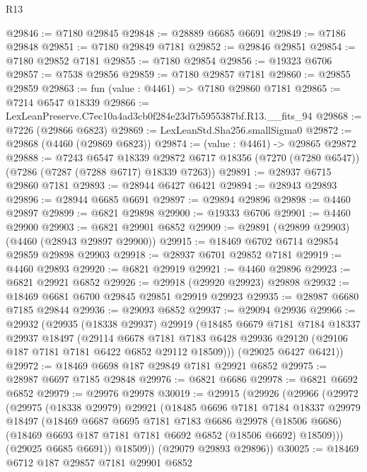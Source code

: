 \begin{lexlean}{R13}
\begin{coremodule}
@29846 := @7180 @29845
@29848 := @28889 @6685 @6691
@29849 := @7186 @29848
@29851 := @7180 @29849 @7181
@29852 := @29846 @29851
@29854 := @7180 @29852 @7181
@29855 := @7180 @29854
@29856 := @19323 @6706
@29857 := @7538 @29856
@29859 := @7180 @29857 @7181
@29860 := @29855 @29859
@29863 := fun (value : @4461) => @7180 @29860 @7181
@29865 := @7214 @6547 @18339
@29866 := LexLeanPreserve.C7ec10a4ad3cb0f284e23d7b5955387bf.R13.__fits_94
@29868 := @7226 (@29866 @6823)
@29869 := LexLeanStd.Sha256.smallSigma0
@29872 := @29868 (@4460 (@29869 @6823))
@29874 := (value : @4461) -> @29865 @29872
@29888 := @7243
    @6547
    @18339
    @29872
    @6717
    @18356
    (@7270 (@7280 @6547))
    (@7286 (@7287 (@7288 @6717) @18339 @7263))
@29891 := @28937 @6715 @29860 @7181
@29893 := @28944 @6427 @6421
@29894 := @28943 @29893
@29896 := @28944 @6685 @6691
@29897 := @29894 @29896
@29898 := @4460 @29897
@29899 := @6821 @29898
@29900 := @19333 @6706
@29901 := @4460 @29900
@29903 := @6821 @29901 @6852
@29909 := @29891 (@29899 @29903) (@4460 (@28943 @29897 @29900))
@29915 := @18469 @6702 @6714 @29854 @29859 @29898 @29903
@29918 := @28937 @6701 @29852 @7181
@29919 := @4460 @29893
@29920 := @6821 @29919
@29921 := @4460 @29896
@29923 := @6821 @29921 @6852
@29926 := @29918 (@29920 @29923) @29898
@29932 := @18469 @6681 @6700 @29845 @29851 @29919 @29923
@29935 := @28987 @6680 @7185 @29844
@29936 := @29093 @6852
@29937 := @29094 @29936
@29966 := @29932
    (@29935
      (@18338 @29937)
      @29919
      (@18485
        @6679
        @7181
        @7184
        @18337
        @29937
        @18497
        (@29114
          @6678
          @7181
          @7183
          @6428
          @29936
          @29120
          (@29106 @187 @7181 @7181 @6422 @6852 @29112 @18509)))
      (@29025 @6427 @6421))
@29972 := @18469 @6698 @187 @29849 @7181 @29921 @6852
@29975 := @28987 @6697 @7185 @29848
@29976 := @6821 @6686
@29978 := @6821 @6692 @6852
@29979 := @29976 @29978
@30019 := @29915
    (@29926
      (@29966
        (@29972
          (@29975
            (@18338 @29979)
            @29921
            (@18485
              @6696
              @7181
              @7184
              @18337
              @29979
              @18497
              (@18469
                @6687
                @6695
                @7181
                @7183
                @6686
                @29978
                (@18506 @6686)
                (@18469 @6693 @187 @7181 @7181 @6692 @6852 (@18506 @6692) @18509)))
            (@29025 @6685 @6691))
          @18509))
      (@29079 @29893 @29896))
@30025 := @18469 @6712 @187 @29857 @7181 @29901 @6852

\end{coremodule}
\end{lexlean}
